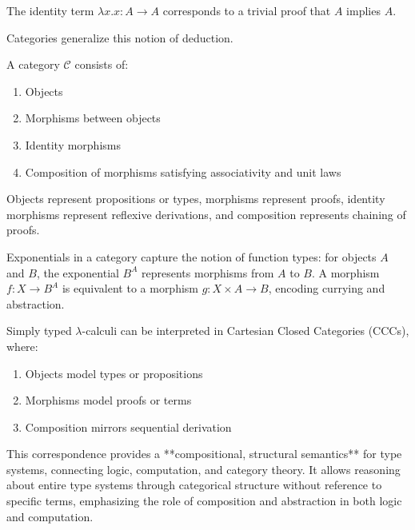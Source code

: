 \begin{example}
The identity term $\lambda x.x : A \to A$ corresponds to a trivial proof that $A$ implies $A$.
\end{example}
Categories generalize this notion of deduction.  
\begin{definition}[Category]
A category $\mathcal{C}$ consists of:
\begin{enumerate}
    \item Objects
    \item Morphisms between objects
    \item Identity morphisms
    \item Composition of morphisms satisfying associativity and unit laws
\end{enumerate}
\end{definition}
\begin{definition}
Objects represent propositions or types, morphisms represent proofs, identity morphisms represent reflexive derivations, and composition represents chaining of proofs.
\end{definition}
Exponentials in a category capture the notion of function types: for objects $A$ and $B$, the exponential $B^A$ represents morphisms from $A$ to $B$. A morphism $f : X \to B^A$ is equivalent to a morphism $g : X \times A \to B$, encoding currying and abstraction.  
\begin{definition}
Simply typed $\lambda$-calculi can be interpreted in Cartesian Closed Categories (CCCs), where:
\begin{enumerate}
    \item Objects model types or propositions
    \item Morphisms model proofs or terms
    \item Composition mirrors sequential derivation
\end{enumerate}
\end{definition}
This correspondence provides a **compositional, structural semantics** for type systems, connecting logic, computation, and category theory. It allows reasoning about entire type systems through categorical structure without reference to specific terms, emphasizing the role of composition and abstraction in both logic and computation.





